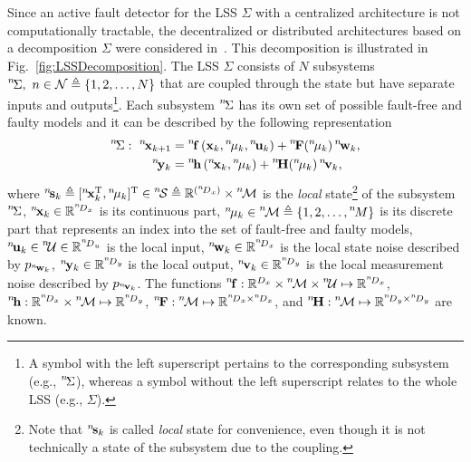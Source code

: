 \documentclass[conference,10pt]{IEEEtran}
\def\nth{\prescript{n\!}{}}
\begin{document}
Since an active fault detector for the LSS $\Sigma$ with a centralized architecture is not computationally tractable, the decentralized or distributed architectures based on a decomposition $\Sigma$ were considered in~\cite{Puncochar2019:cp:ACC,Straka2019:cp:FUSION}. 
This decomposition is illustrated  in Fig.~\ref{fig:LSSDecomposition}. 
The LSS $\Sigma$ consists of $N$ subsystems $\nth{\Sigma},\ n\in\mcN\triangleq\{1,2,\ldots,N\}$ that are coupled through the state but have separate inputs and outputs\footnote{A symbol with the left superscript pertains to the corresponding subsystem (e.g., $\nth{\Sigma}$), whereas a symbol without the left superscript relates to the whole LSS (e.g., $\Sigma$).}. 
Each subsystem $\nth{\Sigma}$ has its own set of possible fault-free and faulty models and it can be described by the following representation
\begin{subequations}
	\label{ali:subsystem}
	\begin{align}
		\nth{\Sigma}:\ \nth{\bfx}_{k+1} & = \nth{\bff} \left(\bfx_{k},\nth{\mu}_{k},\nth{\bfu}_{k} \right) + \nth{\bfF}(\nth{\mu}_k)\nth{\bfw}_k, \label{ali:subsystemDynamics} \\
		\nth{\bfy}_{k} &= \nth{\bfh} \left(\nth{\bfx}_{k},\nth{\mu}_{k}\right) + \nth{\bfH}(\nth{\mu}_k)\nth{\bfv}_k, \label{ali:subsystemObservation}
	\end{align}
\end{subequations}
where $\nth{\bfs}_{k} \triangleq [\nth{\bfx}^{\T}_{k}, \nth{\mu}_{k}]^{\T} \in \nth{\mcS} \triangleq \bbR^{(\nth{D}_x)} \times \nth{\mcM}$ is the \emph{local} state\footnote{Note that $\nth{\bfs}_{k}$ is called \emph{local} state for convenience, even though it is not technically a state of the subsystem due to the coupling.} of the subsystem $\nth{\Sigma}$, $\nth{\bfx}_{k}\in\bbR^{\nth{D}_x}$ is its continuous part, $\nth{\mu}_{k}\in\nth{\mcM}\triangleq\{1,2,\ldots,\nth{M}\}$ is its discrete part that represents an index into the set of fault-free and faulty models, $\nth{\bfu}_k\in\nth{\mcU}\in\bbR^{\nth{D}_u}$ is the local input, $\nth{\bfw}_k\in\bbR^{\nth{D}_x}$ is the local state noise described by $p_{\nth{\bfw}_k}$, $\nth{\bfy}_k\in\bbR^{\nth{D}_y}$ is the local output, $\nth{\bfv}_k\in\bbR^{\nth{D}_y}$ is the local measurement noise described by $p_{\nth{\bfv}_k}$. 
The functions $\nth{\bff}:\bbR^{D_{x}} \times \nth{\mcM} \times \nth{\mcU} \mapsto \bbR^{\nth{D}_{x}}$, $\nth{\bfh}:\bbR^{\nth{D}_{x}} \times \nth{\mcM} \mapsto \bbR^{\nth{D}_{y}}$, $\nth{\bfF}:\nth{\mcM}\mapsto \bbR^{\nth{D}_{x} \times \nth{D}_{x}}$, and $\nth{\bfH}:\nth{\mcM} \mapsto \bbR^{\nth{D}_{y} \times \nth{D}_{y}}$ are known. 
\end{document}
